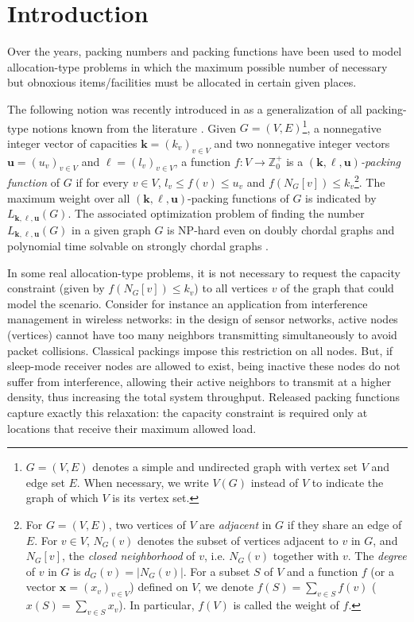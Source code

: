 \documentclass[preprint,12pt]{article}
\renewcommand{\leq}{\leqslant}
\theoremstyle{definition}
\begin{document}
\section{Introduction }\label{sec:intro}

Over the years, packing numbers and packing functions have been used to model allocation-type problems in which the maximum possible number of necessary but obnoxious items/facilities must be allocated in certain given places. 

The following notion was recently introduced in \cite{HNV2023} as a generalization of all packing-type notions known from the literature \cite{ DHL2017, GGHR2010, HL2014,  HLS2020}.
Given $G=(V,E)$\footnote{ 
$G=(V,E)$ denotes a simple and undirected graph with vertex set $V$ and edge set $E$. When necessary, we write $V(G)$ instead of $V$ to indicate the graph of which $V$ is its vertex set.}, a nonnegative integer vector of capacities $\mathbf{k}=(k_v)_{v\in V}$ and two nonnegative integer vectors $\mathbf{u}=(u_v)_{v\in V}$ and $\boldsymbol\ell=(l_v)_{v\in V}$, a function $f : V \rightarrow \mathbb{Z}_0^+$ is a  \emph{$( \mathbf{k}, \boldsymbol\ell, \mathbf{u})$-packing function}
of $G$ if for every $v\in V$, $l_v\leq f(v)\leq u_v$ and $f(N_G[v])\leq k_v$\footnote{For $G=(V,E)$, two vertices of $V$ are \emph{adjacent} in $G$ if they share an edge of $E$.
For $v\in V$, $N_G(v)$  denotes the subset of vertices adjacent to $v$ in $G$, and $N_G[v]$, the \emph{closed neighborhood} of $v$, i.e. $N_G(v)$ together with $v$. The \emph{degree} of $v$ in $G$ is $d_G(v)= |N_G(v)|$. For a subset $S$ of $V$ and a function $f$ (or a vector $\mathbf{x}=(x_v)_{v\in V}$) defined on $V$, we denote $f(S) = \sum_{v\in S} f(v)$ ($x(S) = \sum_{v\in S} x_v$). In particular, $f(V)$ is called the weight of $f$.}. The maximum weight over all $(\mathbf{k}, \boldsymbol\ell, \mathbf{u})$-packing functions of $G$ is indicated by $L_{\mathbf{k}, \boldsymbol\ell,\mathbf{u}}(G)$.
The associated optimization problem of finding the number $L_{\mathbf{k},\ell,\mathbf{u}}(G)$  in a given graph $G$ is NP-hard even on doubly chordal graphs and polynomial time solvable on strongly chordal graphs \cite{HNV2023}.


In some real allocation-type problems,  it is not necessary to request the capacity constraint (given by $f(N_G[v])\leq k_v$) to all vertices $v$ of the graph that could model the scenario. Consider for instance an application from interference management in wireless networks: in the design of sensor networks, active nodes (vertices) cannot have too many neighbors transmitting simultaneously to avoid packet collisions. Classical packings impose this restriction on all nodes. But, if sleep-mode receiver nodes are allowed to exist, being inactive these nodes do not suffer from interference, allowing their active neighbors to transmit at a higher density, thus increasing the total system throughput.
Released packing functions capture exactly this
relaxation: the capacity constraint is required only at locations that receive
their maximum allowed load.
\end{document}
